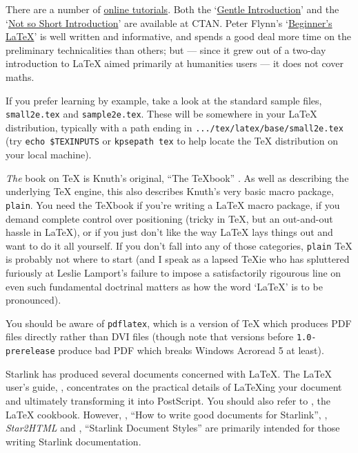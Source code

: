 \documentclass[11pt,oneside,chapters]{starlink}
\begin{document}
There are a number of
\href{http://www.tex.ac.uk/cgi-bin/texfaq2html?label=tutorials}{online tutorials}.
Both the `\href{http://www.tex.ac.uk/tex-archive/info/gentle/}{Gentle Introduction}'
and the `\href{http://www.tex.ac.uk/tex-archive/info/lshort/english/}{Not so Short Introduction}'
are available at CTAN.  Peter Flynn's
`\href{http://www.silmaril.ie/downloads/documents/beginlatex.pdf}{Beginner's LaTeX}'
is well written and informative, and
spends a good deal more time on the preliminary technicalities than
others; but --- since it grew out of a two-day introduction to LaTeX
aimed primarily at humanities users --- it does not cover maths.


If you prefer learning by example, take a look at the standard sample
files, \texttt{small2e.tex} and \texttt{sample2e.tex}.  These will be
somewhere in your LaTeX distribution, typically with a path ending
in \texttt{.../tex/latex/base/small2e.tex} (try \texttt{echo \$TEXINPUTS}
or \texttt{kpsepath tex} to help locate the TeX
distribution on your local machine).

\emph{The} book on TeX is Knuth's original,
``The TeXbook'' \citep{knuth}.  As well as describing
the underlying TeX engine, this also
describes Knuth's very basic macro package, \texttt{plain}.  You need
the TeXbook if you're writing a LaTeX macro package, if you
demand complete control over positioning (tricky in TeX, but an
out-and-out hassle in LaTeX), or if you just don't like the way
LaTeX lays things out and want to do it all yourself.  If you don't
fall into any of those categories, \texttt{plain} TeX is probably
not where to start (and I speak as a lapsed TeXie who has spluttered
furiously at Leslie Lamport's failure to impose a satisfactorily
rigourous line on even such fundamental doctrinal matters as how the
word `LaTeX' is to be pronounced).

You should be aware of \texttt{pdflatex}, which is a version of
TeX which produces PDF files directly rather than DVI files (though
note that versions before \texttt{1.0-prerelease} produce bad PDF
which breaks Windows Acroread 5 at least).

Starlink has produced several documents concerned with LaTeX.
The LaTeX user's guide,
,
concentrates on the practical details of LaTeXing your document and
ultimately transforming it into PostScript.  You should also refer to
, the LaTeX cookbook.
However, , ``How to write good
documents for
Starlink'', , \emph{Star2HTML} and
, ``Starlink Document Styles'' are
primarily intended for those writing Starlink
documentation.
\end{document}
